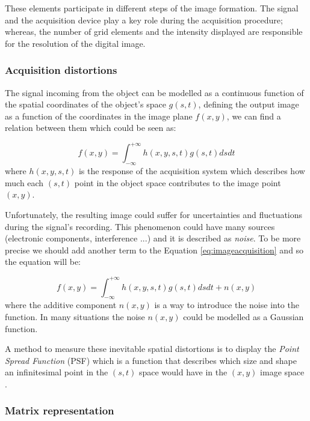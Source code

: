\documentclass[../main.tex]{subfiles}
\begin{document}
These elements participate in different steps of the image formation. The signal and the acquisition device play a key role during the acquisition procedure; whereas, the number of grid elements and the intensity displayed are responsible for the resolution of the digital image.

\subsubsection{Acquisition distortions}

The signal incoming from the object can be modelled as a continuous function of the spatial coordinates of the object's space $g(s,t)$, defining the output image as a function of the coordinates in the image plane $f(x,y)$, we can find a relation between them which could be seen as:

\begin{equation} \label{eq:imageacquisition}
    f(x,y) = \int_{-\infty}^{+\infty} h(x,y,s,t)g(s,t) dsdt
\end{equation}
where $h(x,y,s,t)$ is the response of the acquisition system which describes how much each $(s,t)$ point in the object space contributes to the image point $(x,y)$.

Unfortunately, the resulting image could suffer for uncertainties and fluctuations during the signal's recording. This phenomenon could have many sources (electronic components, interference ...) and it is described as \textit{noise}.
To be more precise we should add another term to the Equation \ref{eq:imageacquisition} and so the equation will be:

\begin{equation} \label{eq:imageacquisition+noise}
    f(x,y) = \int_{-\infty}^{+\infty} h(x,y,s,t)g(s,t) dsdt  + n(x,y)
\end{equation}
where the additive component $n(x,y)$ is a way to introduce the noise into the function. 
In many situations the noise $n(x,y)$ could be modelled as a Gaussian function.

A method to measure these inevitable spatial distortions is to display the \textit{Point Spread Function} (PSF) which is a function that describes which size and shape an infinitesimal point in the $(s,t)$ space would have in the $(x,y)$ image space \cite{bourne2010fundamentals}.

\subsubsection{Matrix representation}\label{sec:matrix_representation}
\end{document}
